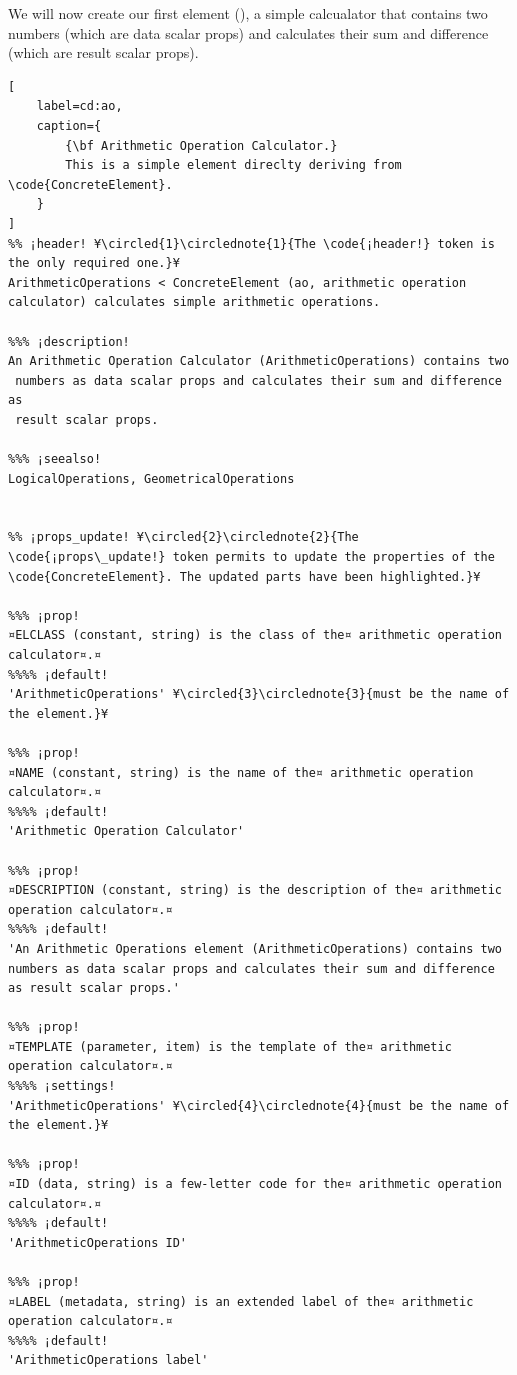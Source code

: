 \documentclass{tufte-handout}
\begin{document}
We will now create our first element (), a simple calcualator that contains two numbers (which are data scalar props) and calculates their sum and difference (which are result scalar props).

\begin{lstlisting}[
	label=cd:ao,
	caption={
		{\bf Arithmetic Operation Calculator.}
		This is a simple element direclty deriving from \code{ConcreteElement}.
	}
]
%% ¡header! ¥\circled{1}\circlednote{1}{The \code{¡header!} token is the only required one.}¥
ArithmeticOperations < ConcreteElement (ao, arithmetic operation calculator) calculates simple arithmetic operations.

%%% ¡description!
An Arithmetic Operation Calculator (ArithmeticOperations) contains two 
 numbers as data scalar props and calculates their sum and difference as 
 result scalar props.

%%% ¡seealso!
LogicalOperations, GeometricalOperations


%% ¡props_update! ¥\circled{2}\circlednote{2}{The \code{¡props\_update!} token permits to update the properties of the \code{ConcreteElement}. The updated parts have been highlighted.}¥

%%% ¡prop!
¤ELCLASS (constant, string) is the class of the¤ arithmetic operation calculator¤.¤
%%%% ¡default!
'ArithmeticOperations' ¥\circled{3}\circlednote{3}{must be the name of the element.}¥

%%% ¡prop!
¤NAME (constant, string) is the name of the¤ arithmetic operation calculator¤.¤
%%%% ¡default!
'Arithmetic Operation Calculator'

%%% ¡prop!
¤DESCRIPTION (constant, string) is the description of the¤ arithmetic operation calculator¤.¤
%%%% ¡default!
'An Arithmetic Operations element (ArithmeticOperations) contains two numbers as data scalar props and calculates their sum and difference as result scalar props.'

%%% ¡prop!
¤TEMPLATE (parameter, item) is the template of the¤ arithmetic operation calculator¤.¤
%%%% ¡settings!
'ArithmeticOperations' ¥\circled{4}\circlednote{4}{must be the name of the element.}¥

%%% ¡prop!
¤ID (data, string) is a few-letter code for the¤ arithmetic operation calculator¤.¤
%%%% ¡default!
'ArithmeticOperations ID'

%%% ¡prop!
¤LABEL (metadata, string) is an extended label of the¤ arithmetic operation calculator¤.¤
%%%% ¡default!
'ArithmeticOperations label'


\end{lstlisting}
\end{document}

